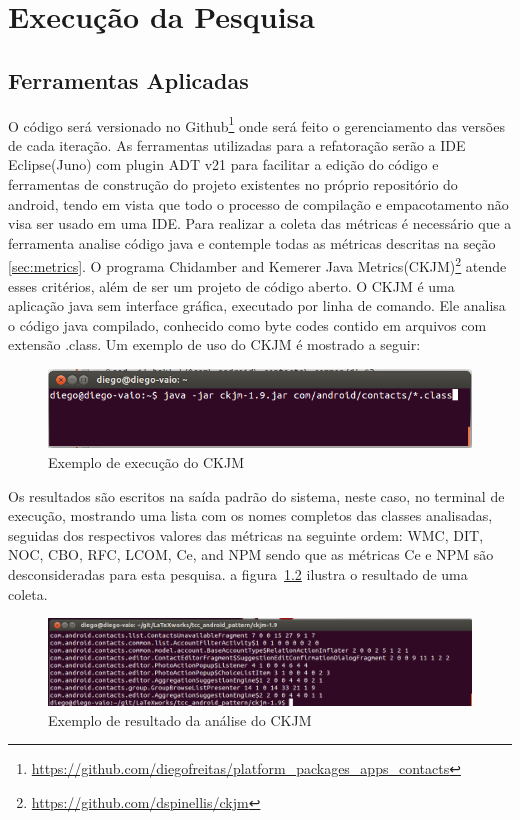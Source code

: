 \chapter{Execução da Pesquisa}


\section{Ferramentas Aplicadas}

O código será versionado no
Github\footnote{\url{https://github.com/diegofreitas/platform_packages_apps_contacts}}
onde será feito o gerenciamento das versões de cada iteração.
As ferramentas utilizadas para a refatoração serão a IDE Eclipse(Juno) com
plugin ADT v21 para facilitar a edição do código e ferramentas de construção
do projeto existentes no próprio repositório do android, tendo em vista que todo
o processo de compilação e empacotamento não visa ser usado em uma IDE.
Para realizar a coleta das métricas é necessário que a ferramenta analise código
java e contemple todas as métricas descritas na seção \ref{sec:metrics}. O
programa Chidamber and Kemerer Java
Metrics(CKJM)\footnote{\url{https://github.com/dspinellis/ckjm}} atende esses
critérios, além de ser um projeto de código aberto. O CKJM é uma aplicação java
sem interface gráfica, executado por linha de comando. Ele analisa o código java
compilado, conhecido como byte codes contido em arquivos com extensão .class. Um
exemplo de uso do CKJM é mostrado a seguir:

\begin{figure}[!h]
	\centering
	\includegraphics[scale=0.5]{img/ckjm_run.png}
	\caption{Exemplo de execução do CKJM} 
	\label{fig:ckjm_run}
\end{figure}


Os resultados são escritos na saída padrão do sistema, neste caso, no terminal
de execução, mostrando uma lista com os nomes completos das classes
analisadas, seguidas dos respectivos valores das métricas na seguinte
ordem: WMC, DIT, NOC, CBO, RFC, LCOM, Ce, and NPM sendo que as métricas Ce e
NPM são desconsideradas para esta pesquisa. a figura~\ref{fig:ckjm_result}
ilustra o resultado de uma coleta.


\begin{figure}[!h]
	\centering
	\includegraphics[scale=0.45]{img/ckjm_result.png}
	\caption{Exemplo de resultado da análise do CKJM} 
	\label{fig:ckjm_result}
\end{figure}


